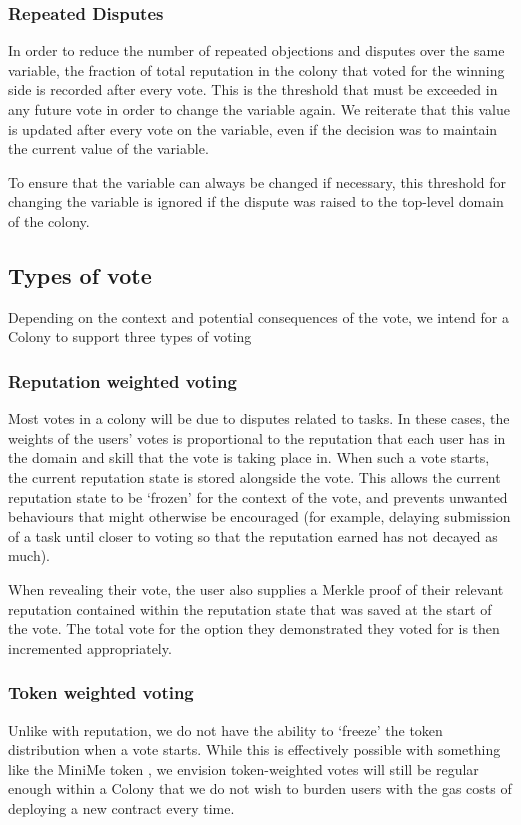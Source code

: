 \subsubsection{Repeated Disputes}\label{sec:repeated-disputes}
In order to reduce the number of repeated objections and disputes over the same variable, the fraction of total reputation in the colony that voted for the winning side is recorded after every vote. This is the threshold that must be exceeded in any future vote in order to change the variable again. We reiterate that this value is updated after every vote on the variable, even if the decision was to maintain the current value of the variable.

To ensure that the variable can always be changed if necessary, this threshold for changing the variable is ignored if the dispute was raised to the top-level domain of the colony.

\subsection{Types of vote}
Depending on the context and potential consequences of the vote, we intend for a Colony to support three types of voting

\subsubsection{Reputation weighted voting}
Most votes in a colony will be due to disputes related to tasks. In these cases, the weights of the users' votes is proportional to the reputation that each user has in the domain and skill that the vote is taking place in. When such a vote starts, the current reputation state is stored alongside the vote. This allows the current reputation state to be `frozen' for the context of the vote, and prevents unwanted behaviours that might otherwise be encouraged (for example, delaying submission of a task until closer to voting so that the reputation earned has not decayed as much).

When revealing their vote, the user also supplies a Merkle proof of their relevant reputation contained within the reputation state that was saved at the start of the vote. The total vote for the option they demonstrated they voted for is then incremented appropriately.

\subsubsection{Token weighted voting}
Unlike with reputation, we do not have the ability to `freeze' the token distribution when a vote starts. While this is effectively possible with something like the MiniMe token \cite{minime}, we envision token-weighted votes will still be regular enough within a Colony that we do not wish to burden users with the gas costs of deploying a new contract every time.

